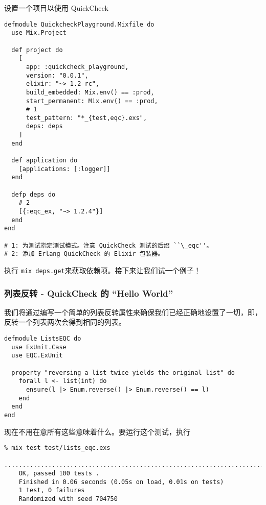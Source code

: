 \begin{code}{设置一个项目以使用 QuickCheck}
\begin{verbatim}
defmodule QuickcheckPlayground.Mixfile do
  use Mix.Project

  def project do
    [
      app: :quickcheck_playground,
      version: "0.0.1",
      elixir: "~> 1.2-rc",
      build_embedded: Mix.env() == :prod,
      start_permanent: Mix.env() == :prod,
      # 1
      test_pattern: "*_{test,eqc}.exs",
      deps: deps
    ]
  end

  def application do
    [applications: [:logger]]
  end

  defp deps do
    # 2
    [{:eqc_ex, "~> 1.2.4"}]
  end
end

# 1: 为测试指定测试模式。注意 QuickCheck 测试的后缀 ``\_eqc''。
# 2: 添加 Erlang QuickCheck 的 Elixir 包装器。
\end{verbatim}
\label{lst:set_up_a_project_to_use_quickcheck}
\end{code}


执行 \texttt{mix deps.get}来获取依赖项。接下来让我们试一个例子！

\subsubsection{列表反转 - QuickCheck 的 ``Hello World''}

我们将通过编写一个简单的列表反转属性来确保我们已经正确地设置了一切，即，反转一个列表两次会得到相同的列表。

\begin{code}{}
\begin{verbatim}
defmodule ListsEQC do
  use ExUnit.Case
  use EQC.ExUnit

  property "reversing a list twice yields the original list" do
    forall l <- list(int) do
      ensure(l |> Enum.reverse() |> Enum.reverse() == l)
    end
  end
end
\end{verbatim}
\end{code}

现在不用在意所有这些意味着什么。要运行这个测试，执行
\begin{code}{}
  \begin{verbatim}
% mix test test/lists_eqc.exs
    .................................................................................................... 
    OK, passed 100 tests .   
    Finished in 0.06 seconds (0.05s on load, 0.01s on tests)
    1 test, 0 failures  
    Randomized with seed 704750
\end{verbatim}
  \end{code}

